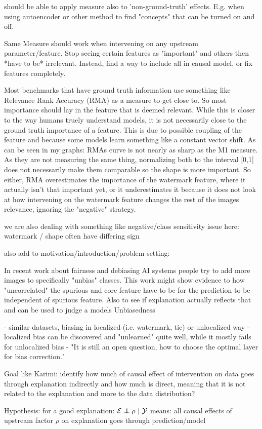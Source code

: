 {should be able to apply measure also to 'non-ground-truth' effects. E.g. when using autoencoder or other method to find "concepts" that can be turned on and off. 

Same Measure should work when intervening on any upstream parameter/feature. Stop seeing certain features as "important" and others then *have to be* irrelevant. Instead, find a way to include all in causal model, or fix features completely.

Most benchmarks that have ground truth information use something like Relevance Rank Accuracy (RMA) as a measure to get close to. So most importance should lay in the feature that is deemed relevant. While this is closer to the way humans truely understand models, it is not necessarily close to the ground truth importance of a feature. This is due to possible coupling of the feature and because some models learn something like a constant vector shift. 
As can be seen in my graphs: RMAs curve is not nearly as sharp as the M1 measure. As they are not measuring the same thing, normalizing both to the interval [0,1] does not necessarily make them comparable so the shape is more important. So either, RMA overestimates the importance of the watermark feature, where it actually isn't that important yet, or it underestimates it because it does not look at how intervening on the watermark feature changes the rest of the images relevance, ignoring the "negative" strategy. 

we are also dealing with something like negative/class sensitivity issue here: watermark / shape often have differing sign


also add to motivation/introduction/problem setting: 

In recent work about fairness and debiasing AI systems people try to add more images to specifically "unbias" classes. This work might show evidence to how "uncorrelated" the spurious and core feature have to be for the prediction to be independent of spurious feature. Also to see if explanation actually reflects that and can be used to judge a models Unbiasedness

\cite{Dreyer2023a}
- similar datasets, biasing in localized (i.e. watermark, tie) or unlocalized way
- localized bias can be discovered and "unlearned" quite well, while it mostly fails for unlocalized bias
- "It is still an open question, how to choose the optimal layer for bias correction."
}


Goal like Karimi: identify how much of causal effect of intervention on data goes through explanation indirectly and how much is direct, meaning that it is not related to the explanation and more to the data distribution?

Hypothesis: for a good explanation:
$\mathcal{E} \independent \rho \ | \ \mathcal{Y}$
means: all causal effects of upstream factor $\rho$ on explanation goes through prediction/model
